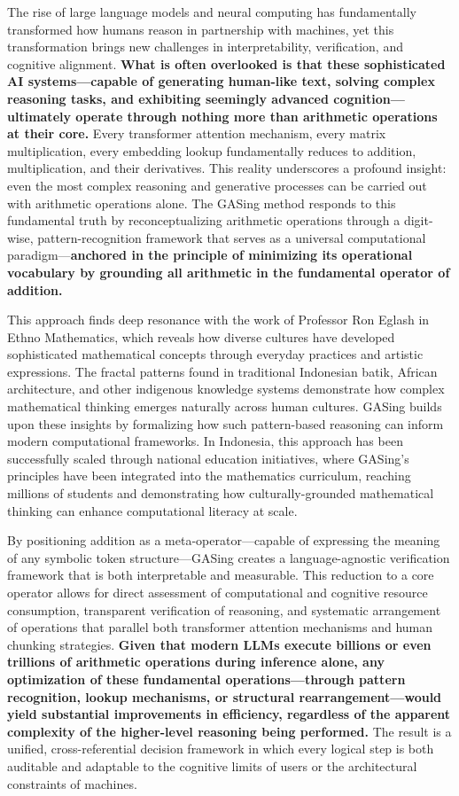 The rise of large language models and neural computing has fundamentally transformed how humans reason in partnership with machines, yet this transformation brings new challenges in interpretability, verification, and cognitive alignment. \textbf{What is often overlooked is that these sophisticated AI systems—capable of generating human-like text, solving complex reasoning tasks, and exhibiting seemingly advanced cognition—ultimately operate through nothing more than arithmetic operations at their core.} Every transformer attention mechanism, every matrix multiplication, every embedding lookup fundamentally reduces to addition, multiplication, and their derivatives. This reality underscores a profound insight: even the most complex reasoning and generative processes can be carried out with arithmetic operations alone. The GASing method responds to this fundamental truth by reconceptualizing arithmetic operations through a digit-wise, pattern-recognition framework that serves as a universal computational paradigm—\textbf{anchored in the principle of minimizing its operational vocabulary by grounding all arithmetic in the fundamental operator of addition.}

This approach finds deep resonance with the work of Professor Ron Eglash in Ethno Mathematics, which reveals how diverse cultures have developed sophisticated mathematical concepts through everyday practices and artistic expressions. The fractal patterns found in traditional Indonesian batik, African architecture, and other indigenous knowledge systems demonstrate how complex mathematical thinking emerges naturally across human cultures. GASing builds upon these insights by formalizing how such pattern-based reasoning can inform modern computational frameworks. In Indonesia, this approach has been successfully scaled through national education initiatives, where GASing's principles have been integrated into the mathematics curriculum, reaching millions of students and demonstrating how culturally-grounded mathematical thinking can enhance computational literacy at scale.

By positioning addition as a meta-operator—capable of expressing the meaning of any symbolic token structure—GASing creates a language-agnostic verification framework that is both interpretable and measurable. This reduction to a core operator allows for direct assessment of computational and cognitive resource consumption, transparent verification of reasoning, and systematic arrangement of operations that parallel both transformer attention mechanisms and human chunking strategies. \textbf{Given that modern LLMs execute billions or even trillions of arithmetic operations during inference alone, any optimization of these fundamental operations—through pattern recognition, lookup mechanisms, or structural rearrangement—would yield substantial improvements in efficiency, regardless of the apparent complexity of the higher-level reasoning being performed.} The result is a unified, cross-referential decision framework in which every logical step is both auditable and adaptable to the cognitive limits of users or the architectural constraints of machines.

